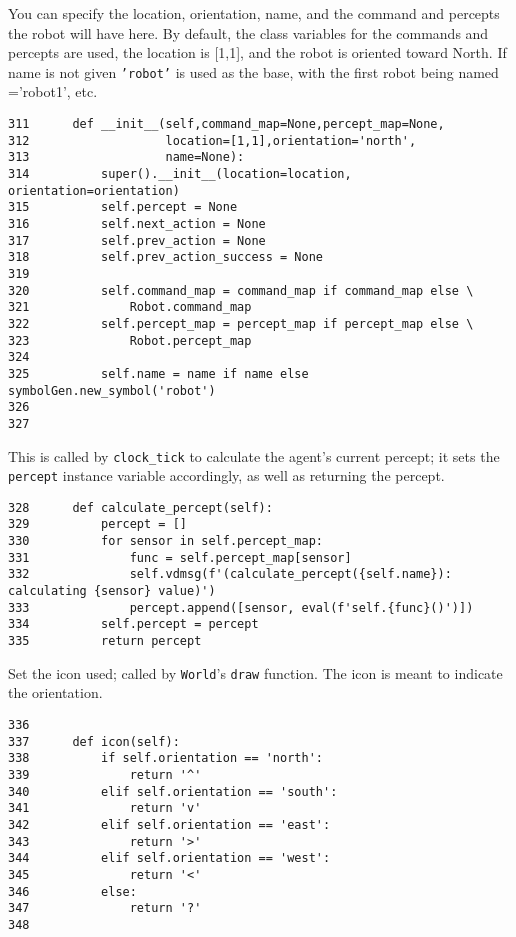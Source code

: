 \documentclass[11pt]{tufte-handout}
\begin{document}
You can specify the location, orientation, name, and the command and percepts the robot will have here.  By default, the class variables for the commands and percepts are used, the location is [1,1], and the robot is oriented toward North.  If name is not given \texttt{'robot'} is used as the base, with the first robot being named ='robot1', etc.

\begin{verbatim}
311      def __init__(self,command_map=None,percept_map=None,
312                   location=[1,1],orientation='north',
313                   name=None):
314          super().__init__(location=location, orientation=orientation)
315          self.percept = None
316          self.next_action = None
317          self.prev_action = None
318          self.prev_action_success = None
319          
320          self.command_map = command_map if command_map else \
321              Robot.command_map
322          self.percept_map = percept_map if percept_map else \
323              Robot.percept_map
324  
325          self.name = name if name else symbolGen.new_symbol('robot')
326  
327  
\end{verbatim}

This is called by \texttt{clock\_tick} to calculate the agent's current percept; it sets the \texttt{percept} instance variable accordingly, as well as returning the percept.

\begin{verbatim}
328      def calculate_percept(self):
329          percept = []
330          for sensor in self.percept_map:
331              func = self.percept_map[sensor]
332              self.vdmsg(f'(calculate_percept({self.name}): calculating {sensor} value)')
333              percept.append([sensor, eval(f'self.{func}()')])
334          self.percept = percept
335          return percept
\end{verbatim}

Set the icon used; called by \texttt{World}'s \texttt{draw} function.  The icon is meant to indicate the orientation.

\begin{verbatim}
336  
337      def icon(self):
338          if self.orientation == 'north':
339              return '^'
340          elif self.orientation == 'south':
341              return 'v'
342          elif self.orientation == 'east':
343              return '>'
344          elif self.orientation == 'west':
345              return '<'
346          else:
347              return '?'
348          
\end{verbatim}
\end{document}
